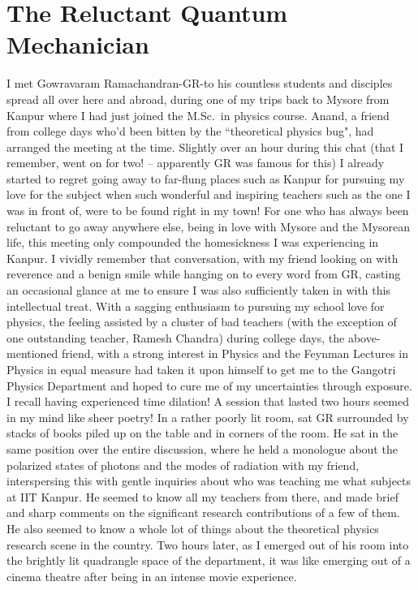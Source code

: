 \chapter[The Reluctant Quantum Mechanician]{The Reluctant Quantum Mechanician}\label{chap22}


\vskip -5pt

I met Gowravaram Ramachandran-GR-to his countless students and disciples spread all over here and abroad, during one of my trips back to Mysore from Kanpur where I had just joined the M.Sc.\ in physics course. Anand, a friend from college days who'd been bitten by the ``theoretical physics bug", had arranged the meeting at the time. Slightly over an hour during this chat (that I remember, went on for two! -- apparently GR was famous for this) I already started to regret going away to far-flung places such as Kanpur for pursuing my love for the subject when such wonderful and inspiring teachers such as the one I was in front of, were to be found right in my town! For one who has always been reluctant to go away anywhere else, being in love with Mysore and the Mysorean life, this meeting only compounded the homesickness I was experiencing in Kanpur. I vividly remember that conversation, with my friend looking on with reverence and a benign smile while hanging on to every word from GR, casting an occasional glance at me to ensure I was also sufficiently taken in with this intellectual treat. With a sagging enthusiasm to pursuing my school love for physics, the feeling assisted by a cluster of bad teachers (with the exception of one outstanding teacher, Ramesh Chandra) during college days, the above-mentioned friend, with a strong interest in Physics and the Feynman Lectures in Physics in equal measure had taken it upon himself to get me to the Gangotri Physics Department and hoped to cure me of my uncertainties through exposure. I recall having experienced time dilation!  A session that lasted two hours seemed in my mind like sheer poetry! In a rather poorly lit room, sat GR surrounded by stacks of books piled up on the table and in corners of the room. He sat in the same position over the entire discussion, where he held a monologue about the polarized states of photons and the modes of radiation with my friend, interspersing this with gentle inquiries about who was teaching me what subjects at IIT Kanpur. He seemed to know all my teachers from there, and made brief and sharp comments on the significant research contributions of a few of them. He also seemed to know a whole lot of things about the theoretical physics research scene in the country. Two hours later, as I emerged out of his room into the brightly lit quadrangle space of the department, it was like emerging out of a cinema theatre after being in an intense movie experience. 

